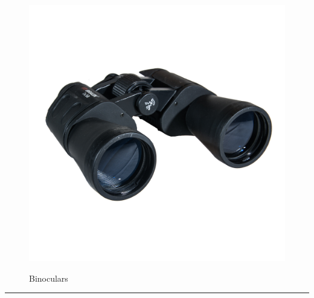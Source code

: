 \documentclass{article}
\begin{document}
    \begin{figure}[H]
        \centering
        \begin{minipage}{0.25\textwidth}
            \centering
            \includegraphics[width=\textwidth]{../SurvivalItemImages/binoculars}
        \end{minipage}\hfill
        \begin{minipage}{0.7\textwidth}
            \centering
            \Large Binoculars
        \end{minipage}
    \end{figure}
    \vspace{-0.8em}
    \noindent\rule{\textwidth}{0.4pt}
            
\end{document}
